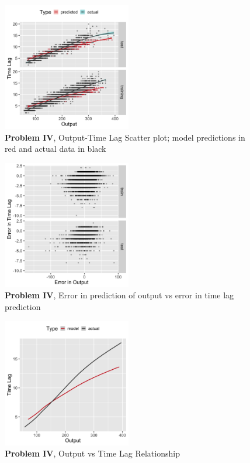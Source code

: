 \documentclass[envcountsect,runningheads]{llncs}
\theoremstyle{etoile}
\begin{document}
\begin{figure}[h]
\vspace{.3in}
\centerline{\includegraphics[width=0.5\textwidth]{figures/exp4_scatter_v_tl.png}}
\vspace{.3in}
\caption{\textbf{Problem IV}, Output-Time Lag Scatter plot; model predictions in red and actual data in black}
\label{fig:problem4_scatter}
\end{figure}

\begin{figure}[h]
\vspace{.3in}
\centerline{\includegraphics[width=0.5\textwidth]{figures/exp4_scatter_errors.png}}
\vspace{.3in}
\caption{\textbf{Problem IV}, Error in prediction of output vs error in time lag prediction}
\label{fig:problem4_error}
\end{figure}

\begin{figure}[h]
\vspace{.3in}
\centerline{\includegraphics[width=0.5\textwidth]{figures/exp4_predictive_curves.png}}
\vspace{.3in}
\caption{\textbf{Problem IV}, Output vs Time Lag Relationship}
\label{fig:problem4_curves}
\end{figure}
\end{document}
